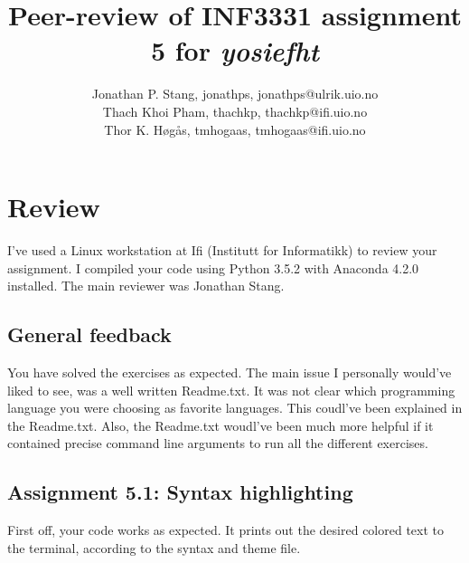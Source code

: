 \documentclass[a4paper]{article}
\title{Peer-review of INF3331 assignment 5 for \textit{yosiefht}}
\author{Jonathan P. Stang, jonathps, {jonathps@ulrik.uio.no} \\
 		Thach Khoi Pham, thachkp, {thachkp@ifi.uio.no} \\
		Thor K. Høgås, tmhogaas, {tmhogaas@ifi.uio.no}}
\begin{document}
\maketitle

\section{Review }\label{sec:review}
I've used a Linux workstation at Ifi (Institutt for Informatikk) to review your assignment. I compiled your code using Python 3.5.2 with Anaconda 4.2.0 installed. The main reviewer was Jonathan Stang.

\subsection*{General feedback}
You have solved the exercises as expected. The main issue I personally would've liked to see, was a well written Readme.txt. It was not clear which programming language you were choosing as favorite languages. This coudl've been explained in the Readme.txt.
Also, the Readme.txt woudl've been much more helpful if it contained precise command line arguments to run all the different exercises.


\subsection*{Assignment 5.1: Syntax highlighting}
First off, your code works as expected. It prints out the desired colored text to the terminal, according to the syntax and theme file.
\end{document}
